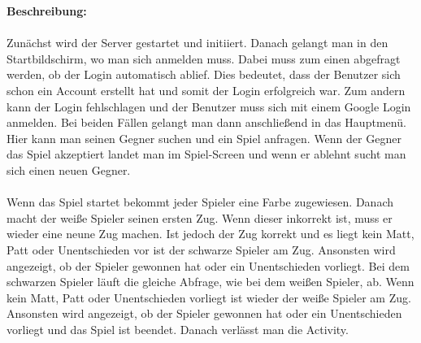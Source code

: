 \documentclass[parskip=full]{scrartcl}
\begin{document}
	\begin{description}
	
	\item \textbf{Beschreibung:}\\ \\
		Zunächst wird der Server gestartet und initiiert. Danach gelangt man in den Startbildschirm, wo man sich anmelden muss. Dabei muss zum einen abgefragt werden, ob der Login automatisch ablief. Dies bedeutet, dass der Benutzer sich schon ein Account erstellt hat und somit der Login erfolgreich war. Zum andern kann der Login fehlschlagen und der Benutzer muss sich mit einem Google Login anmelden. Bei beiden Fällen gelangt man dann anschließend in das Hauptmenü. Hier kann man seinen Gegner suchen und ein Spiel anfragen. Wenn der Gegner das Spiel akzeptiert landet man im Spiel-Screen und wenn er ablehnt sucht man sich einen neuen Gegner.\\ \\
		Wenn das Spiel startet bekommt jeder Spieler eine Farbe zugewiesen. Danach macht der weiße Spieler seinen ersten Zug. Wenn dieser inkorrekt ist, muss er wieder eine neune Zug machen. Ist jedoch der Zug korrekt und es liegt kein Matt, Patt oder Unentschieden vor ist der schwarze Spieler am Zug. Ansonsten wird angezeigt, ob der Spieler gewonnen hat oder ein Unentschieden vorliegt. 
		Bei dem schwarzen Spieler läuft die gleiche Abfrage, wie bei dem weißen Spieler, ab. Wenn kein Matt, Patt oder Unentschieden vorliegt ist wieder der weiße Spieler am Zug. Ansonsten wird angezeigt, ob der Spieler gewonnen hat oder ein Unentschieden vorliegt und das Spiel ist beendet. Danach verlässt man die Activity.

\end{description}
\end{document}
